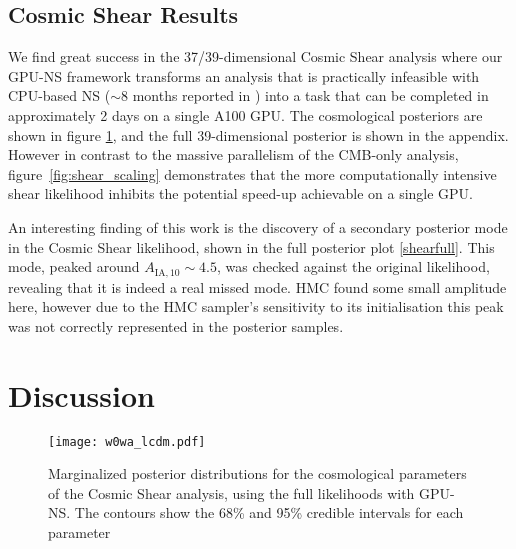 \documentclass[twocolumn]{openjournal}
\begin{document}
\subsection{Cosmic Shear Results}
We find great success in the 37/39-dimensional Cosmic Shear analysis where our GPU-NS framework transforms an analysis that is practically infeasible with CPU-based NS ($\sim$8 months reported in \citep{Piras_2024}) into a task that can be completed in approximately 2 days on a single A100 GPU. The cosmological posteriors are shown in figure \ref{shearmarg}, and the full 39-dimensional posterior is shown in the appendix. However in contrast to the massive parallelism of the CMB-only analysis, figure~\ref{fig:shear_scaling} demonstrates that the more computationally intensive shear likelihood inhibits the potential speed-up achievable on a single GPU.

An interesting finding of this work is the discovery of a secondary posterior mode in the Cosmic Shear likelihood, shown in the full posterior plot \ref{shearfull}. This mode, peaked around $A_{\text{IA},10} \sim 4.5$, was checked against the original \citep{jaxcosmo} likelihood, revealing that it is indeed a real missed mode. HMC found some small amplitude here, however due to the HMC sampler's sensitivity to its initialisation this peak was not correctly represented in the posterior samples.

\section{Discussion}

\begin{figure}
    \centering
    \texttt{[image: w0wa\_lcdm.pdf]}
    \caption{Marginalized posterior distributions for the cosmological parameters of the Cosmic Shear analysis, using the full likelihoods with GPU-NS. The contours show the 68\% and 95\% credible intervals for each parameter}
    \label{shearmarg}
\end{figure}
\end{document}
